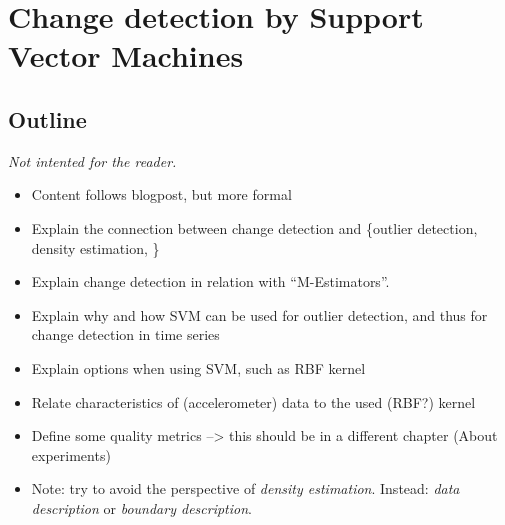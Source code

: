 
\chapter{Change detection by Support Vector Machines}

\label{Chapter3} %


\section{Outline}
\emph{Not intented for the reader.}
\begin{itemize}
  \item Content follows blogpost, but more formal
  \item Explain the connection between change detection and \{outlier detection, density estimation, \etc\}
  \item Explain change detection in relation with ``M-Estimators''.
  \item Explain why and how SVM can be used for outlier detection, and thus for change detection in time series
  \item Explain options when using SVM, such as RBF kernel
  \item Relate characteristics of (accelerometer) data to the used (RBF?) kernel
  \item Define some quality metrics --> this should be in a different chapter (About experiments)
  \item Note: try to avoid the perspective of \emph{density estimation}. Instead: \emph{data description} or \emph{boundary description}.
\end{itemize}





